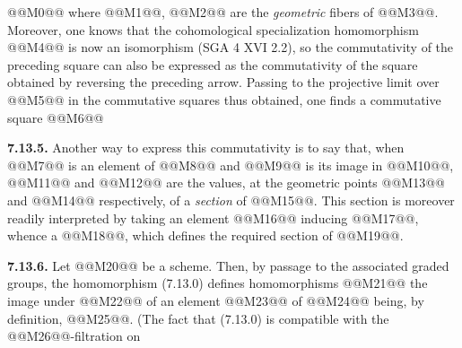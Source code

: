 
@@M0@@
where @@M1@@, @@M2@@ are the \emph{geometric} fibers of @@M3@@. Moreover, one knows that the cohomological specialization homomorphism @@M4@@ is now an isomorphism (SGA 4 XVI 2.2), so the commutativity of the preceding square can also be expressed as the commutativity of the square obtained by reversing the preceding arrow. Passing to the projective limit over @@M5@@ in the commutative squares thus obtained, one finds a commutative square
@@M6@@

\textbf{7.13.5.} Another way to express this commutativity is to say that, when @@M7@@ is an element of @@M8@@ and @@M9@@ is its image in @@M10@@, @@M11@@ and @@M12@@ are the values, at the geometric points @@M13@@ and @@M14@@ respectively, of a \emph{section} of @@M15@@. This section is moreover readily interpreted by taking an element @@M16@@ inducing @@M17@@, whence a @@M18@@, which defines the required section of @@M19@@.

\textbf{7.13.6.} Let @@M20@@ be a scheme. Then, by passage to the associated graded groups, the homomorphism (7.13.0) defines homomorphisms
@@M21@@
the image under @@M22@@ of an element @@M23@@ of @@M24@@ being, by definition, @@M25@@. (The fact that (7.13.0) is compatible with the @@M26@@-filtration on
